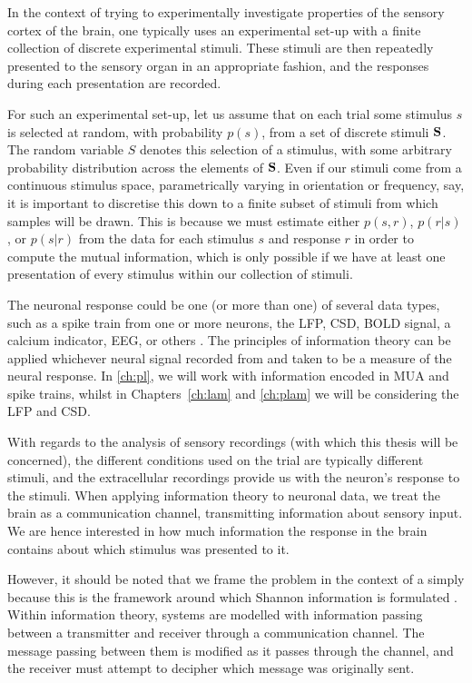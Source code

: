 In the context of trying to experimentally investigate properties of the sensory cortex of the brain, one typically uses an experimental set-up with a finite collection of discrete experimental stimuli.
These stimuli are then repeatedly presented to the sensory organ in an appropriate fashion, and the responses during each presentation are recorded.

For such an experimental set-up, let us assume that on each trial some stimulus $s$ is selected at random, with probability $p(s)$, from a set of discrete stimuli $\mathbf{S}$.
The random variable $S$ denotes this selection of a stimulus, with some arbitrary probability distribution across the elements of $\mathbf{S}$.
Even if our stimuli come from a continuous stimulus space, parametrically varying in orientation or frequency, say, it is important to discretise this down to a finite subset of stimuli from which samples will be drawn.
This is because we must estimate either $p(s,r)$, $p(r|s)$, or $p(s|r)$ from the data for each stimulus $s$ and response $r$ in order to compute the mutual information, which is only possible if we have at least one presentation of every stimulus within our collection of stimuli.

The neuronal response could be one (or more than one) of several data types, such as a spike train from one or more neurons, the \ac{LFP}, \ac{CSD}, \ac{BOLD} signal, a calcium indicator, \ac{EEG}, or others \citep{Magri2009,Quiroga2009}.
The principles of information theory can be applied whichever neural signal recorded from and taken to be a measure of the neural response.
In \autoref{ch:pl}, we will work with information encoded in \ac{MUA} and spike trains, whilst in Chapters~\ref{ch:lam} and \ref{ch:plam} we will be considering the \ac{LFP} and \ac{CSD}.

With regards to the analysis of sensory recordings (with which this thesis will be concerned), the different conditions used on the trial are typically different stimuli, and the extracellular recordings provide us with the neuron's response to the stimuli.
When applying information theory to neuronal data, we treat the brain as a communication channel, transmitting information about sensory input.
We are hence interested in how much information the response in the brain contains about which stimulus was presented to it.

However, it should be noted that we frame the problem in the context of a  simply because this is the framework around which Shannon information is formulated \citep[Chapter~2]{mackay2003information}.
Within information theory, systems are modelled with information passing between a transmitter and receiver through a communication channel.
The message passing between them is modified as it passes through the channel, and the receiver must attempt to decipher which message was originally sent.

